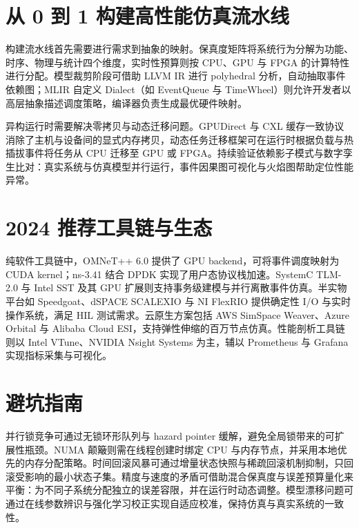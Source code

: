 \chapter{从 0 到 1 构建高性能仿真流水线}
构建流水线首先需要进行需求到抽象的映射。保真度矩阵将系统行为分解为功能、时序、物理与统计四个维度，实时性预算则按 CPU、GPU 与 FPGA 的计算特性进行分配。模型裁剪阶段可借助 LLVM IR 进行 polyhedral 分析，自动抽取事件依赖图；MLIR 自定义 Dialect（如 EventQueue 与 TimeWheel）则允许开发者以高层抽象描述调度策略，编译器负责生成最优硬件映射。\par
异构运行时需要解决零拷贝与动态迁移问题。GPUDirect 与 CXL 缓存一致协议消除了主机与设备间的显式内存拷贝，动态任务迁移框架可在运行时根据负载与热插拔事件将任务从 CPU 迁移至 GPU 或 FPGA。持续验证依赖影子模式与数字孪生比对：真实系统与仿真模型并行运行，事件因果图可视化与火焰图帮助定位性能异常。\par
\chapter{2024 推荐工具链与生态}
纯软件工具链中，OMNeT++ 6.0 提供了 GPU backend，可将事件调度映射为 CUDA kernel；ns-3.41 结合 DPDK 实现了用户态协议栈加速。SystemC TLM-2.0 与 Intel SST 及其 GPU 扩展则支持事务级建模与并行离散事件仿真。半实物平台如 Speedgoat、dSPACE SCALEXIO 与 NI FlexRIO 提供确定性 I/O 与实时操作系统，满足 HIL 测试需求。云原生方案包括 AWS SimSpace Weaver、Azure Orbital 与 Alibaba Cloud ESI，支持弹性伸缩的百万节点仿真。性能剖析工具链则以 Intel VTune、NVIDIA Nsight Systems 为主，辅以 Prometheus 与 Grafana 实现指标采集与可视化。\par
\chapter{避坑指南}
并行锁竞争可通过无锁环形队列与 hazard pointer 缓解，避免全局锁带来的可扩展性瓶颈。NUMA 颠簸则需在线程创建时绑定 CPU 与内存节点，并采用本地优先的内存分配策略。时间回滚风暴可通过增量状态快照与稀疏回滚机制抑制，只回滚受影响的最小状态子集。精度与速度的矛盾可借助混合保真度与误差预算量化来平衡：为不同子系统分配独立的误差容限，并在运行时动态调整。模型漂移问题可通过在线参数辨识与强化学习校正实现自适应校准，保持仿真与真实系统的一致性。\par
